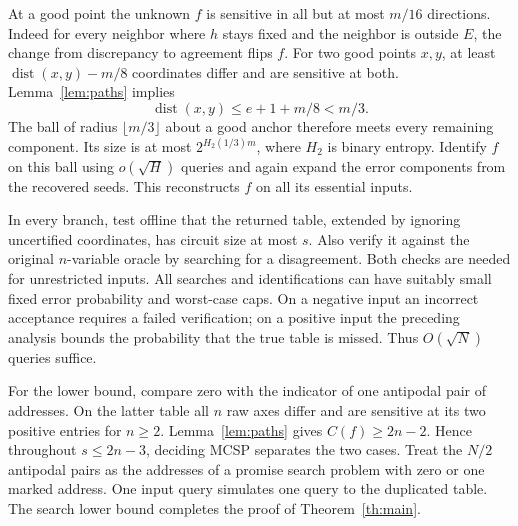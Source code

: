 \documentclass[11pt]{article}
\newcommand{\dist}{\operatorname{dist}}
\begin{document}
At a good point the unknown $f$ is sensitive in all but at most $m/16$ directions. Indeed for every neighbor where $h$ stays fixed and the neighbor is outside $E$, the change from discrepancy to agreement flips $f$. For two good points $x,y$, at least $\dist(x,y)-m/8$ coordinates differ and are sensitive at both. Lemma~\ref{lem:paths} implies
\[
                \dist(x,y)\le e+1+m/8<m/3.
\]
The ball of radius $\lfloor m/3\rfloor$ about a good anchor therefore meets every remaining component. Its size is at most $2^{H_2(1/3)m}$, where $H_2$ is binary entropy. Identify $f$ on this ball using $o(\sqrt H)$ queries and again expand the error components from the recovered seeds. This reconstructs $f$ on all its essential inputs.

In every branch, test offline that the returned table, extended by ignoring uncertified coordinates, has circuit size at most $s$. Also verify it against the original $n$-variable oracle by searching for a disagreement. Both checks are needed for unrestricted inputs. All searches and identifications can have suitably small fixed error probability and worst-case caps. On a negative input an incorrect acceptance requires a failed verification; on a positive input the preceding analysis bounds the probability that the true table is missed. Thus $O(\sqrt N)$ queries suffice.

For the lower bound, compare zero with the indicator of one antipodal pair of addresses. On the latter table all $n$ raw axes differ and are sensitive at its two positive entries for $n\ge2$. Lemma~\ref{lem:paths} gives $C(f)\ge2n-2$. Hence throughout $s\le2n-3$, deciding MCSP separates the two cases. Treat the $N/2$ antipodal pairs as the addresses of a promise search problem with zero or one marked address. One input query simulates one query to the duplicated table. The search lower bound \cite{bbbv} completes the proof of Theorem~\ref{th:main}.
\end{document}
